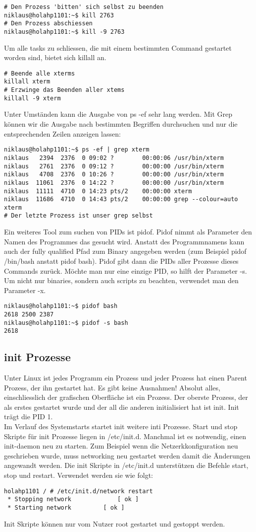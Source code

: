 \begin{lstlisting}
# Den Prozess 'bitten' sich selbst zu beenden
niklaus@holahp1101:~$ kill 2763
# Den Prozess abschiessen
niklaus@holahp1101:~$ kill -9 2763
\end{lstlisting}
Um alle tasks zu schliessen, die mit einem bestimmten Command gestartet worden sind, bietet sich killall an.
\begin{lstlisting}
# Beende alle xterms
killall xterm
# Erzwinge das Beenden aller xtems
killall -9 xterm
\end{lstlisting}
Unter Umst\"anden kann die Ausgabe von ps -ef sehr lang werden. Mit Grep k\"onnen wir die Ausgabe nach bestimmten Begriffen durchsuchen und nur die entsprechenden Zeilen anzeigen lassen:
\begin{lstlisting}
niklaus@holahp1101:~$ ps -ef | grep xterm
niklaus   2394  2376  0 09:02 ?        00:00:06 /usr/bin/xterm
niklaus   2761  2376  0 09:12 ?        00:00:00 /usr/bin/xterm
niklaus   4708  2376  0 10:26 ?        00:00:00 /usr/bin/xterm
niklaus  11061  2376  0 14:22 ?        00:00:00 /usr/bin/xterm
niklaus  11111  4710  0 14:23 pts/2    00:00:00 xterm
niklaus  11686  4710  0 14:43 pts/2    00:00:00 grep --colour=auto xterm
# Der letzte Prozess ist unser grep selbst
\end{lstlisting}
Ein weiteres Tool zum suchen von PIDs ist pidof. Pidof nimmt als Parameter den Namen des Programmes das gesucht wird. Anstatt des Programmnamens kann auch der fully qualified Pfad zum Binary angegeben werden (zum Beispiel pidof /bin/bash anstatt pidof bash). Pidof gibt dann die PIDs aller Prozesse dieses Commands zur\"uck. M\"ochte man nur eine einzige PID, so hilft der Parameter -s. Um nicht nur binaries, sondern auch scripts zu beachten, verwendet man den Parameter -x.
\begin{lstlisting}
niklaus@holahp1101:~$ pidof bash
2618 2500 2387
niklaus@holahp1101:~$ pidof -s bash
2618
\end{lstlisting}
\subsection{init Prozesse}
Unter Linux ist jedes Programm ein Prozess und jeder Prozess hat einen Parent Prozess, der ihn gestartet hat. Es gibt keine Ausnahmen! Absolut alles, einschliesslich der grafischen Oberfl\"ache ist ein Prozess. Der oberste Prozess, der als erstes gestartet wurde und der all die anderen initialisiert hat ist init. Init tr\"agt die PID 1.\\
Im Verlauf des Systemstarts startet init weitere inti Prozesse. Start und stop Skripte f\"ur init Prozesse liegen in /etc/init.d. Manchmal ist es notwendig, einen init-daemon neu zu starten. Zum Beispiel wenn die Netzerkkonfiguration neu geschrieben wurde, muss networking neu gestartet werden damit die \"Anderungen angewandt werden. Die init Skripte in /etc/init.d unterst\"utzen die Befehle start, stop und restart. Verwendet werden sie wie folgt:
\begin{lstlisting}
holahp1101 / # /etc/init.d/network restart
 * Stopping network             [ ok ]
 * Starting network 	   	[ ok ]
\end{lstlisting}
Init Skripte k\"onnen nur vom Nutzer root gestartet und gestoppt werden.
